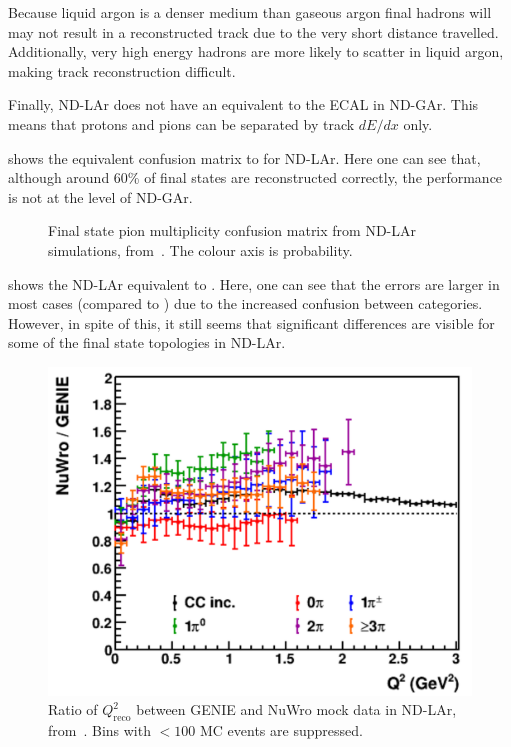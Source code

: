 Because liquid argon is a denser medium than gaseous argon final hadrons will may not result in a reconstructed track due to the very short distance travelled.
Additionally, very high energy hadrons are more likely to scatter in liquid argon, making track reconstruction difficult.

Finally, ND-LAr does not have an equivalent to the ECAL in ND-GAr.
This means that protons and pions can be separated by track $dE/dx$ only.

 shows the equivalent confusion matrix to  for ND-LAr.
Here one can see that, although around 60\% of final states are reconstructed correctly, the performance is not at the level of ND-GAr.

\begin{figure}[h]
	\begin{adjustbox}{max totalsize=.6\linewidth, center}
		
	\end{adjustbox}
	\caption[Final state pion multiplicity confusion matrix from ND-LAr simulations]{Final state pion multiplicity confusion matrix from ND-LAr simulations, from~\cite{ndCdr}. The colour axis is probability.}
	\label{fig:larConfusMat}
\end{figure}

 shows the ND-LAr equivalent to . 
Here, one can see that the errors are larger in most cases (compared to ) due to the increased confusion between categories.
However, in spite of this, it still seems that significant differences are visible for some of the final state topologies in ND-LAr.

\begin{figure}[h]
	\centering
	\includegraphics[width=.6\linewidth]{files/figures/dune_ndrwt/larQ2Reco}
	\caption[Ratio of $Q^{2}_{\textrm{reco}}$ between GENIE and NuWro mock data in ND-LAr]{Ratio of $Q^{2}_{\textrm{reco}}$ between GENIE and NuWro mock data in ND-LAr, from~\cite{ndCdr}. Bins with $<100$ MC events are suppressed.}
	\label{fig:q2LarFhc}	
\end{figure}

